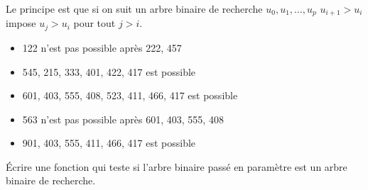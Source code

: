 \begin{Answer}
Le principe est que si on suit un arbre binaire de recherche $u_0, u_1, \ldots, u_p$ $u_{i+1} > u_i$ impose $u_j > u_i$ pour tout $j>i$.


\begin{itemize}
\item 122 n'est pas possible après 222, 457

\item 545, 215, 333, 401, 422, 417 est possible 


\item 601, 403, 555, 408, 523, 411, 466, 417 est possible


\item 563 n'est pas possible après 601, 403, 555, 408


\item 901, 403, 555, 411, 466, 417 est possible
\end{itemize}
\end{Answer}
\begin{Exercise}[title =Vérification]\it

Écrire une fonction qui teste si l'arbre binaire passé en paramètre est un arbre binaire de recherche.
\end{Exercise}
